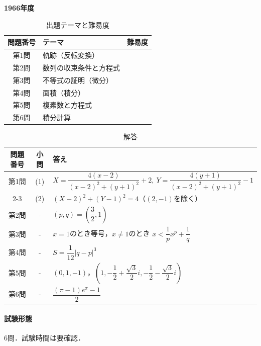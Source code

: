 \documentclass[../../main.tex]{subfiles}
\begin{document}
\begin{center}
  {\fontsize{48pt}{58pt}\selectfont \textbf{1966}\normalsize\textbf{年度}}
\end{center}

\begin{table}[htb]
  \centering
  \caption{出題テーマと難易度}
  \begin{tabular}{|c|p{9cm}|c|}
    \hline
    \textbf{問題番号} & \textbf{テーマ} & \textbf{難易度} \\
    \hline
    第1問 & 軌跡（反転変換） & \\
    \hline
    第2問 & 数列の収束条件と方程式 & \\
    \hline
    第3問 & 不等式の証明（微分） & \\
    \hline
    第4問 & 面積（積分） & \\
    \hline
    第5問 & 複素数と方程式 & \\
    \hline
    第6問 & 積分計算 & \\
    \hline
  \end{tabular}
\end{table}

\begin{table}[htb]
  \centering
  \caption{解答}
  \renewcommand{\arraystretch}{1.4}
  \begin{tabular}{|c|c|p{9cm}|}
    \hline
    \textbf{問題番号} & \textbf{小問} & \textbf{答え} \\
    \hline
    第1問 & (1) & $X=\dfrac{4(x-2)}{(x-2)^2+(y+1)^2}+2,\ Y=\dfrac{4(y+1)}{(x-2)^2+(y+1)^2}-1$ \\
    \cline{2-3}
    & (2) & $(X-2)^2+(Y-1)^2=4$（$(2,-1)$を除く） \\
    \hline
    第2問 & - & $(p,q)=\left(\dfrac{3}{2},1\right)$ \\
    \hline
    第3問 & - & $x=1$のとき等号，$x\ne1$のとき $x<\dfrac{1}{p} x^p+\dfrac{1}{q}$ \\
    \hline
    第4問 & - & $S=\dfrac{1}{12}|q-p|^3$ \\
    \hline
    第5問 & - & $(0,1,-1)$，$\left(1,-\dfrac{1}{2}+\dfrac{\sqrt{3}}{2}i,-\dfrac{1}{2}-\dfrac{\sqrt{3}}{2}i\right)$ \\
    \hline
    第6問 & - & $\dfrac{(\pi-1)e^\pi-1}{2}$ \\
    \hline
  \end{tabular}
\end{table}

\paragraph{試験形態}
6問．試験時間は要確認．
\end{document}
